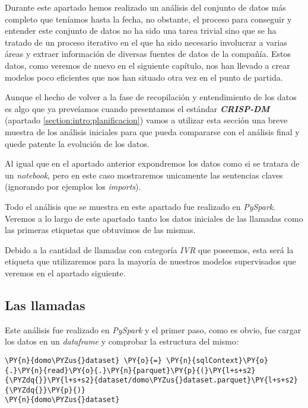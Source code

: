 Durante este apartado hemos realizado un análisis del conjunto de datos más completo que teníamos hasta la fecha, no obstante, el proceso para conseguir y entender este conjunto de datos no ha sido una tarea trivial sino que se ha tratado de un proceso iterativo en el que ha sido necesario involucrar a varias áreas y extraer información de diversas fuentes de datos de la compañía. Estos datos, como veremos de nuevo en el siguiente capítulo, nos han llevado a crear modelos poco eficientes que nos han situado otra vez en el punto de partida. 

Aunque el hecho de volver a la fase de recopilación y entendimiento de los datos es algo que ya preveíamos cuando presentamos el estándar \textbf{\textit{CRISP-DM}} (apartado \ref{section:intro:planificacion}) vamos a utilizar esta sección una breve muestra de los análisis iniciales para que pueda compararse con el análisis final y quede patente la evolución de los datos.

Al igual que en el apartado anterior expondremos los datos como si se tratara de un \textit{notebook}, pero en este caso mostraremos unicamente las sentencias claves (ignorando por ejemplos los \textit{imports}). 

Todo el análisis que se muestra en este apartado fue realizado en \textit{PySpark}. Veremos a lo largo de este apartado tanto los datos iniciales de las llamadas como las primeras etiquetas que obtuvimos de las mismas. 

Debido a la cantidad de llamadas con categoría \textit{IVR} que poseemos, esta será la etiqueta que utilizaremos para la mayoría de nuestros modelos supervisados que veremos en el apartado siguiente. 

\subsection{Las llamadas}



Este análisis fue realizado en \textit{PySpark} y el primer paso, como es obvio, fue cargar los datos en un \textit{dataframe} y comprobar la estructura del mismo: 


\vspace{0.5cm}

\begin{tcolorbox}[breakable, size=fbox, boxrule=1pt, pad at break*=1mm,colback=cellbackground, colframe=cellborder]
\begin{Verbatim}[commandchars=\\\{\}]
\PY{n}{domo\PYZus{}dataset} \PY{o}{=} \PY{n}{sqlContext}\PY{o}{.}\PY{n}{read}\PY{o}{.}\PY{n}{parquet}\PY{p}{(}\PY{l+s+s2}{\PYZdq{}}\PY{l+s+s2}{dataset/domo\PYZus{}dataset.parquet}\PY{l+s+s2}{\PYZdq{}}\PY{p}{)}
\PY{n}{domo\PYZus{}dataset}
\end{Verbatim}
\end{tcolorbox}

